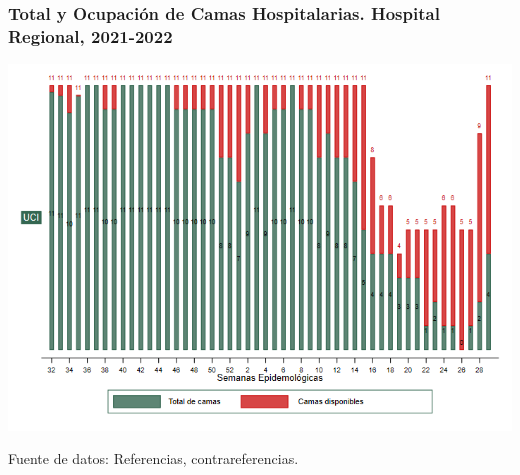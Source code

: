 \documentclass[xcolor=table]{beamer}
\begin{document}
	\begin{frame}
		\frametitle{Total y Ocupación de Camas Hospitalarias. Hospital Regional, 2021-2022}
		\vspace{-.2cm}
		\begin{center}
			\includegraphics[width=0.9\linewidth, trim={0cm .5cm 0cm 0.2cm},clip]{../figuras/h_regional_uci.png}
		\end{center}
		{\tiny Fuente de datos: Referencias, contrareferencias.}
	\end{frame}
\end{document}
